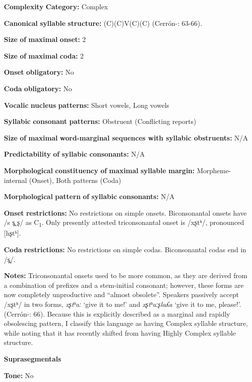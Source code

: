 \begin{styleBody}
\textbf{Complexity} \textbf{Category:} Complex

\textbf{Canonical} \textbf{syllable} \textbf{structure:} (C)(C)V(C)(C) (Cerrón-\citealt{Palomino2006}: 63-66).

\textbf{Size} \textbf{of} \textbf{maximal} \textbf{onset:} 2

\textbf{Size} \textbf{of} \textbf{maximal} \textbf{coda:} 2

\textbf{Onset} \textbf{obligatory:} No

\textbf{Coda} \textbf{obligatory:} No

\textbf{Vocalic} \textbf{nucleus} \textbf{patterns:} Short vowels, Long vowels

\textbf{Syllabic} \textbf{consonant} \textbf{patterns:} Obstruent (Conflicting reports)

\textbf{Size} \textbf{of} \textbf{maximal} \textbf{word{}-marginal sequences with syllabic obstruents:} N/A

\textbf{Predictability} \textbf{of} \textbf{syllabic} \textbf{consonants:} N/A

\textbf{Morphological} \textbf{constituency} \textbf{of} \textbf{maximal} \textbf{syllable} \textbf{margin:} Morpheme-internal (Onset), Both patterns (Coda)

\textbf{Morphological} \textbf{pattern} \textbf{of} \textbf{syllabic} \textbf{consonants:} N/A

\textbf{Onset} \textbf{restrictions:} No restrictions on simple onsets. Biconsonantal onsets have /s s̪ ʂ/ as C\textsubscript{1}. Only presently attested triconsonantal onset is /xʂtʰ/, pronounced [hʂtʰ].

\textbf{Coda} \textbf{restrictions:} No restrictions on simple codas. Biconsonantal codas end in /s̪/.

\textbf{Notes:} Triconsonantal onsets used to be more common, as they are derived from a combination of prefixes and a stem-initial consonant; however, these forms are now completely unproductive and “almost obsolete”. Speakers passively accept /xʂtʰ/ in two forms, \textit{xʂtʰaː} ‘give it to me!’ and \textit{xʂtʰaːʂlaʎa} ‘give it to me, please!’. (Cerrón-\citealt{Palomino2006}: 66). Because this is explicitly described as a marginal and rapidly obsolescing pattern, I classify this language as having Complex syllable structure, while noting that it has recently shifted from having Highly Complex syllable structure.

\textbf{Suprasegmentals}

\textbf{Tone:} No


\end{styleBody}
